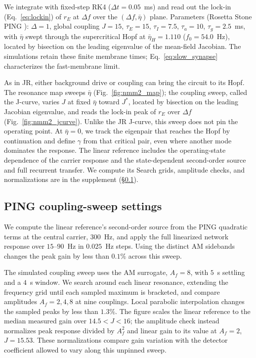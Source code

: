 \documentclass[11pt,a4paper]{article}
\newif\ifjne
\providecommand{\DIFaddtex}[1]{{\protect\color{blue} \sf #1}} %
\providecommand{\DIFdeltex}[1]{{\protect\color{red} \scriptsize #1}} %
\providecommand{\DIFaddbegin}{} %
\providecommand{\DIFaddend}{} %
\providecommand{\DIFdelbegin}{} %
\providecommand{\DIFdelend}{} %
\providecommand{\DIFadd}[1]{\texorpdfstring{\DIFaddtex{#1}}{#1}} %
\providecommand{\DIFdel}[1]{\texorpdfstring{\DIFdeltex{#1}}{}} %
\begin{document}
We integrate with fixed-step RK4 ($\Delta t=0.05$~ms) and read out the lock-in
(Eq.~\eqref{eq:lockin}) of $r_E$ at $\Delta f$ over the $(\Delta f, \bar\eta)$ plane.
Parameters (Rosetta Stone PING \cite{ruffini2025rosetta}): $\Delta=1$, global coupling
$J=15$, $\tau_E=15$, $\tau_I=7.5$, $\tau_a=10$, $\tau_g=2.5$~ms, with $\bar\eta$ swept
through the supercritical Hopf at $\bar\eta_H=1.110$ ($f_0=54.0$~Hz), located by bisection
on the leading eigenvalue of the mean-field Jacobian. The simulations retain these
finite membrane times; Eq.~\eqref{eq:slow_synapse} characterizes the fast-membrane limit.

As in JR, either background drive or coupling can bring the circuit to its Hopf.
The resonance map sweeps $\bar\eta$ (Fig.~\ref{fig:nmm2_map}); the coupling sweep,
called the J-curve, varies
$J$ at fixed $\bar\eta$ toward $J^*$, located by bisection on the leading
Jacobian eigenvalue, and reads the lock-in peak of $r_E$ over $\Delta f$
(Fig.~\ref{fig:nmm2_jcurve}). Unlike the JR J-curve, this sweep does not pin the
operating point. At $\bar\eta=0$, we track the eigenpair that reaches the Hopf by
continuation and define $\gamma$ from that critical pair, even where another mode
dominates the response. The linear reference includes the \DIFdelbegin \DIFdel{operating-state
dependence of the carrier response and
the }\DIFdelend \DIFaddbegin \DIFadd{state-dependent second-order source and
full }\DIFaddend recurrent transfer. \DIFdelbegin \DIFdel{We compute its
}\DIFdelend \DIFaddbegin \DIFadd{Search grids, amplitude checks, and normalizations
are in the supplement (\S\ref{supp:ping-runs}).
}\ifjne\else
\subsection{\DIFadd{PING coupling-sweep settings}}\label{supp:ping-runs}
\DIFadd{We compute the linear reference's
}\DIFaddend second-order source from the PING quadratic terms at the central carrier,
$300$~Hz, and apply the full linearized network response over $15$--$90$~Hz
in $0.025$~Hz steps. Using the distinct AM sidebands changes the peak gain by
less than $0.1\%$ across this sweep.

The simulated coupling sweep uses the AM surrogate, $A_f=8$, with $5$~s
settling and a $4$~s window. We search around each linear resonance, extending
the frequency grid until each sampled maximum is bracketed, and compare
amplitudes $A_f=2,4,8$ at nine couplings. Local parabolic interpolation changes
the sampled peaks by less than $1.3\%$. The figure scales the linear reference
to the median measured gain over $14.5<J<16$; the amplitude check instead
normalizes peak response divided by $A_f^2$ and linear gain to its value at
$A_f=2$, $J=15.53$. These normalizations compare gain variation with the detector coefficient
allowed to vary along this unpinned sweep.
\end{document}
